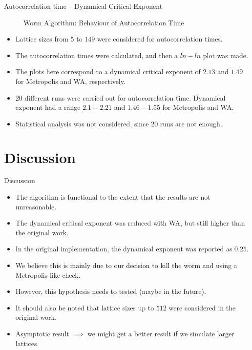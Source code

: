 \documentclass{beamer}
\begin{document}
\begin{frame}{Autocorrelation time – Dynamical Critical Exponent}
\begin{figure}[htbp]
\begin{center}
\begin{minipage}[t]{0.49\linewidth}
		  \caption{Worm Algorithm: Behaviour of Autocorrelation Time}
        \end{minipage}
	\end{center}
    \end{figure}
\end{frame}

\begin{frame}
\begin{itemize}
    \item Lattice sizes from $5$ to $149$ were considered for autocorrelation times.
    \item The autocorrelation times were calculated, and then a $ln-ln$ plot was made.
    \item The plots here correspond to a dynamical critical exponent of $2.13$ and $1.49$ for Metropolis and WA, respectively.
    \item 20 different runs were carried out for autocorrelation time. Dynamical exponent had a range $2.1-2.21$ and $1.46-1.55$ for Metropolis and WA.
    \item Statistical analysis was not considered, since 20 runs are not enough.
\end{itemize}
\end{frame}

\section{Discussion}
\begin{frame}{Discussion}
\begin{itemize}
    \item The algorithm is functional to the extent that the results are not unreasonable.
    \item The dynamical critical exponent was reduced with WA, but still higher than the original work.
    \item In the original implementation, the dynamical exponent was reported as $0.25$.
    \item We believe this is mainly due to our decision to kill the worm and using a Metropolis-like check.
    \item However, this hypothesis needs to tested (maybe in the future).
    \item It should also be noted that lattice sizes up to $512$ were considered in the original work.
    \item Asymptotic result $\implies$ we might get a better result if we simulate larger lattices.
\end{itemize}
\end{frame}
\end{document}

